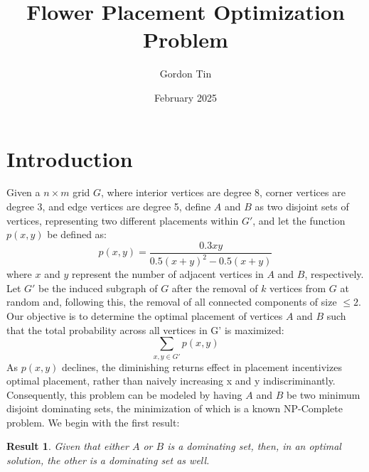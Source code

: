 \documentclass{article}
\title{Flower Placement Optimization Problem}
\author{Gordon Tin}
\date{February 2025}
\newtheorem{result}{Result}
\begin{document}
\maketitle

\section{Introduction}

Given a $n \times m$ grid $G$, where interior vertices are degree 8, corner vertices are degree 3, and edge vertices are degree 5, define $A$ and $B$ as two disjoint sets of vertices, representing two different placements within $G'$, and let the function $p(x,y)$ be defined as: 
\[p(x,y)= \frac{0.3xy}{0.5(x+y)^{2}-0.5(x+y)}\]
where $x$ and $y$ represent the number of adjacent vertices in $A$ and $B$, respectively. Let $G'$ be the induced subgraph of $G$ after the removal of $k$ vertices from $G$ at random and, following this, the removal of all connected components of size $\leq 2$.
Our objective is to determine the optimal placement of vertices $A$ and $B$ such that the total probability across all vertices in G' is maximized: \[\sum_{x,y \in G'} p(x,y)\] 
As \(p(x,y)\) declines, the diminishing returns effect in placement incentivizes optimal placement, rather than naively increasing x and y indiscriminantly. Consequently, this problem can be modeled by having $A$ and $B$ be two minimum disjoint dominating sets, the minimization of which is a known NP-Complete problem. We begin with the first result:

\begin{result}
Given that either $A$ or $B$ is a dominating set, then, in an optimal solution, the other is a dominating set as well.
\end{result}
\end{document}
